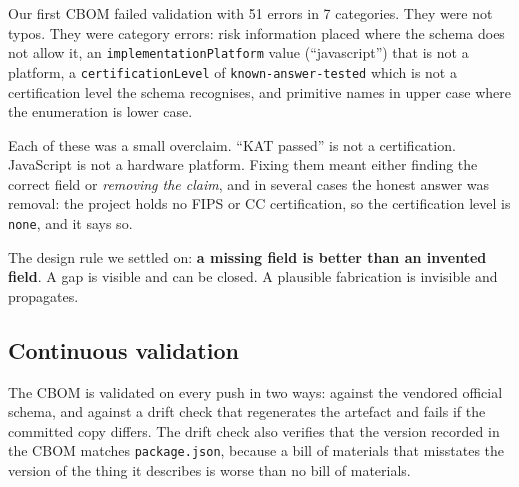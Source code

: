 Our first CBOM failed validation with 51 errors in 7 categories. They were not
typos. They were category errors: risk information placed where the schema does
not allow it, an \texttt{implementationPlatform} value (``javascript'') that is
not a platform, a \texttt{certificationLevel} of
\texttt{known-answer-tested} which is not a certification level the schema
recognises, and primitive names in upper case where the enumeration is lower
case.

Each of these was a small overclaim. ``KAT passed'' is not a certification.
JavaScript is not a hardware platform. Fixing them meant either finding the
correct field or \emph{removing the claim}, and in several cases the honest
answer was removal: the project holds no FIPS or CC certification, so the
certification level is \texttt{none}, and it says so.

The design rule we settled on: \textbf{a missing field is better than an
invented field}. A gap is visible and can be closed. A plausible fabrication is
invisible and propagates.

\subsection{Continuous validation}

The CBOM is validated on every push in two ways: against the vendored official
schema, and against a drift check that regenerates the artefact and fails if the
committed copy differs. The drift check also verifies that the version recorded
in the CBOM matches \texttt{package.json}, because a bill of materials that
misstates the version of the thing it describes is worse than no bill of
materials.
